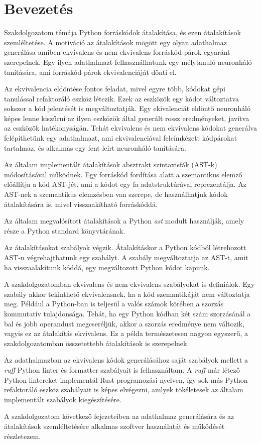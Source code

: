 \chapter{Bevezetés}
\label{ch:intro}

Szakdolgozatom témája Python forráskódok átalakítása, és ezen átalakítások szemléltetése.
A motiváció az átalakítások mögött egy olyan adathalmaz generálása amiben ekvivalens és nem
ekvivalens 
forráskód-párok egyaránt szerepelnek. Egy ilyen adathalmazt felhasználhatunk egy mélytanuló
neuronháló tanítására,
ami forráskód-párok ekvivalenciáját dönti el.

Az ekvivalencia eldöntése fontos feladat, mivel egyre több, kódokat gépi tanulással refaktoráló
eszköz létezik.
Ezek az eszközök egy kódot változtatva sokszor a kód jelentését is megváltoztatják.
Egy ekivalenciát eldöntő neuronháló képes lenne kiszűrni az ilyen eszközök által generált
rossz eredményeket, javítva az eszközök hatékonyságán.
Tehát ekvivalens és nem ekvivalens kódokat generálva felépíthetünk egy adathalmazt, ami
ekvivalenciával felcímkézett kódpárokat tartalmaz, és alkalmas egy fent leírt neuronháló
tanítására.

Az általam implementált átalakítások absztrakt szintaxisfák (AST-k) módosításával működnek.
Egy forráskód fordítása alatt a szemantikus elemző előállítja a kód AST-jét,
ami a kódot egy fa adatstruktúrával reprezentálja.
Az AST-nek a szemantikus elemzésben van szerepe,
de használhatjuk kódok átalakítására is, mivel visszaakítható forráskóddá.

Az általam megvalósított átalakítások a Python \emph{ast} modult \cite{pythonAST} használják,
amely része a Python standard könyvtárának.

\pagebreak

Az átalakításokat szabályok végzik. Átalakításkor 
a Python kódból létrehozott AST-n végrehajthatunk egy szabályt.
A szabály megváltoztatja az AST-t, amit ha visszaalakítunk kóddá,
egy megváltozott Python kódot kapunk.

A szakdolgozatomban ekvivalens és nem ekvivalens szabályokat is definiálok.
Egy szabály akkor tekinthető ekvivalensnek, ha a kód szemantikáját nem változtatja meg.
Például a Python-ban is teljesül a valós számok körében a szorzás kommutatív tulajdonsága.
Tehát, ha egy Python kódban két szám szorzásánál a bal és jobb operandust megcseréljük,
akkor a szorzás eredménye nem változik, vagyis ez az átalakítás ekvivalens.
Ez a példa természetesen nagyon egyszerű, a szakdolgozatomban összetettebb átalakítások
is szerepelnek.

Az adathalmazban az ekvivalens kódok generálásához saját szabályok mellett
a \emph{ruff} Python linter és formatter szabályait is felhasználtam.
A \emph{ruff} már létező Python lintereket implementál Rust programozási nyelven,
így sok más Python refaktoráló eszköz szabályait is képes elvégezni,
amlyek tökéletesek az általam implementált szabályok kiegészítésére.

A szakdolgozatom következő fejezeteiben az adathalmaz generálására és az átalakítások
szemléltetésére alkalmas szoftver használatát és működését részletezem.
